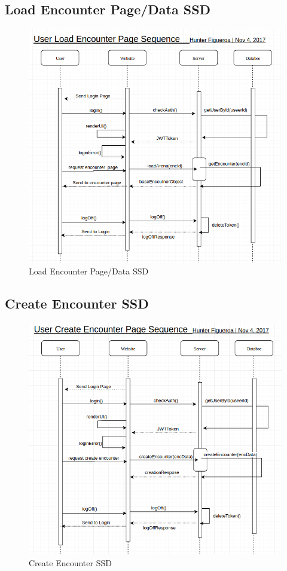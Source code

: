 \documentclass[12pt,a4paper]{report}
\begin{document}
	\newpage
	\subsection {Load Encounter Page/Data SSD}
	\begin{figure}[H]
		\centering
		\centerline{\includegraphics[scale=.7, angle=90]{ssd_encounter_page}}
		\caption{Load Encounter Page/Data SSD}
		\label{fig: Load Encounter Page/Data SSD }
	\end{figure}
	
	\newpage
	\subsection {Create Encounter SSD}
	\begin{figure}[H]
		\centering
		\centerline{\includegraphics[scale=.7, angle=90]{ssd_create_enc}}
		\caption{Create Encounter SSD}
		\label{fig: Create Encounter SSD }
	\end{figure}
	
\end{document}
